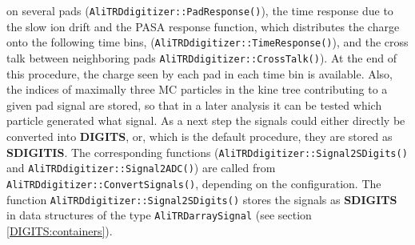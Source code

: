 \documentclass{alicetdr}
\begin{document}
on several pads ({\tt AliTRDdigitizer::PadResponse()}), the time response due 
to the slow ion drift and the PASA response function, which distributes the
charge onto the following time bins, ({\tt AliTRDdigitizer::TimeResponse()}), 
and the cross talk between neighboring pads {\tt AliTRD\-digitizer::CrossTalk()}).  
At the end of this procedure, the charge seen by each pad in each time bin 
is available.  Also, the indices of maximally three MC particles in the kine
tree contributing to a given pad signal are stored, so that in a later 
analysis it can be tested which particle generated what signal.
As a next step the signals could either directly be converted into {\bf DIGITS},
or, which is the default procedure, they are stored as {\bf SDIGITIS}.
The corresponding functions ({\tt AliTRDdigitizer::Signal2SDigits()} and
{\tt AliTRDdigitizer::Signal2ADC()}) are called from 
{\tt AliTRDdigitizer::ConvertSignals()}, depending on the configuration.
The function {\tt AliTRDdigitizer::Signal2SDigits()} stores the signals as 
{\bf SDIGITS} in data structures of the type {\tt AliTRDarraySignal} (see 
section \ref{DIGITS:containers}).  
\end{document}
